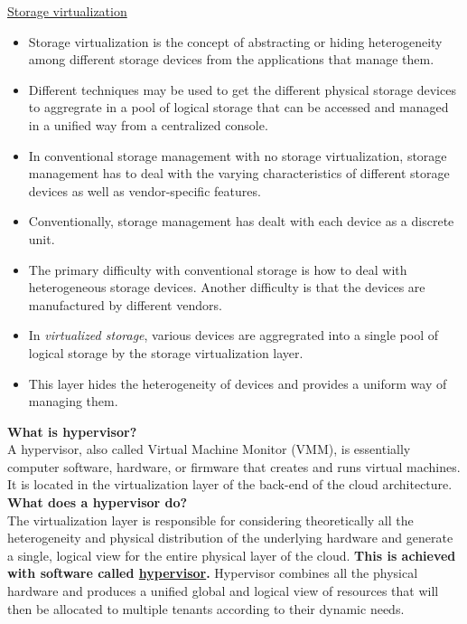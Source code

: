 \documentclass[a4paper, 12pt]{article}
\begin{document}
\underline{Storage virtualization}
\begin{itemize}
\item
Storage virtualization is the concept of abstracting or hiding heterogeneity among different storage devices from the applications that manage them.
\item
Different techniques may be used to get the different physical storage devices to aggregrate in a pool of logical storage that can be accessed and managed in a unified way from a centralized console.
\item
In conventional storage management with no storage virtualization, storage management has to deal with the varying characteristics of different storage devices as well as vendor-specific features.
\item
Conventionally, storage management has dealt with each device as a discrete unit.
\item
The primary difficulty with conventional storage is how to deal with heterogeneous storage devices. Another difficulty is that the devices are manufactured by different vendors.
\item
In \textit{virtualized storage}, various devices are aggregrated into a single pool of logical storage by the storage virtualization layer.
\item
This layer hides the heterogeneity of devices and provides a uniform way of managing them.
\end{itemize}

\textbf{What is hypervisor?}\\
A hypervisor, also called Virtual Machine Monitor (VMM), is essentially computer software, hardware, or firmware that creates and runs virtual machines. It is located in the virtualization layer of the back-end of the cloud architecture.\\

\textbf{What does a hypervisor do?}\\
The virtualization layer is responsible for considering theoretically all the heterogeneity and physical distribution of the underlying hardware and generate a single, logical view for the entire physical layer of the cloud. \textbf{This is achieved with software called \underline{hypervisor}.} Hypervisor combines all the physical hardware and produces a unified global and logical view of resources that will then be allocated to multiple tenants according to their dynamic needs.
\end{document}
